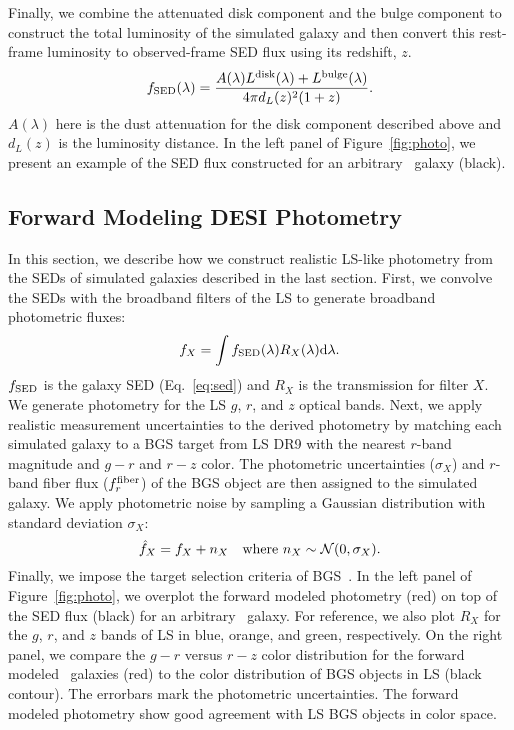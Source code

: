 Finally, we combine the attenuated disk component and the bulge component to
construct the total luminosity of the simulated galaxy and then convert this
rest-frame luminosity to observed-frame SED flux using its redshift, $z$.
\begin{equation}\label{eq:sed} 
    f_{\rm SED}(\lambda) = \frac{A(\lambda)L^{\rm disk}(\lambda) + L^{\rm bulge}(\lambda)}{4 \pi d_L(z)^2 (1+z)}.
\end{equation}
$A(\lambda)$ here is the dust attenuation for the disk component described
above and $d_L(z)$ is the luminosity distance.
In the left panel of Figure~\ref{fig:photo}, we present an example of the SED
flux constructed for an arbitrary \lgal~galaxy (black).

\subsection{Forward Modeling DESI Photometry} \label{sec:photo} 
In this section, we describe how we construct realistic LS-like photometry
from the SEDs of simulated galaxies described in the last section.
First, we convolve the SEDs with the broadband filters of the LS to generate
broadband photometric fluxes: 
\begin{equation} \label{eq:photo}
    f_X = \int f_{\rm SED}(\lambda) R_X(\lambda) {\rm d}\lambda.
\end{equation}
$f_{\rm SED}$ is the galaxy SED (Eq.~\ref{eq:sed}) and $R_X$ is the
transmission for filter $X$. 
We generate photometry for the LS $g$, $r$, and $z$ optical bands.
Next, we apply realistic measurement uncertainties to the derived photometry by
matching each simulated galaxy to a BGS target from LS DR9 with the nearest
$r$-band magnitude and $g-r$ and $r-z$ color.
The photometric uncertainties ($\sigma_X$) and $r$-band fiber flux ($f_r^{\rm
fiber}$) of the BGS object are then assigned to the simulated galaxy. 
We apply photometric noise by sampling a Gaussian distribution with standard
deviation $\sigma_X$: 
\begin{equation}
    \hat{f}_X = f_X + n_X  \quad {\rm where}~n_X \sim \mathcal{N}(0, \sigma_X).
\end{equation} 
Finally, we impose the target selection criteria of BGS~\citep[][Hahn~\etal~in
prep.]{ruiz-macias2021}.
In the left panel of Figure~\ref{fig:photo}, we overplot the forward
modeled photometry (red) on top of the SED flux (black) for an arbitrary
\lgal~galaxy. 
For reference, we also plot $R_X$ for the $g$, $r$, and $z$ bands of LS in
blue, orange, and green, respectively. 
On the right panel, we compare the $g - r$ versus $r - z$ color distribution
for the forward modeled \lgal~galaxies (red) to the color distribution of BGS
objects in LS (black contour). 
The errorbars mark the photometric uncertainties. 
The forward modeled photometry show good agreement with LS BGS objects in
color space.

